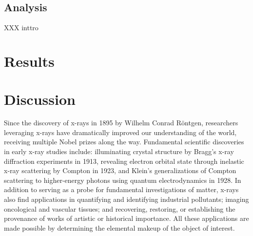 \documentclass[%
  aip,12pt,tightenlines,
  amsthm,
 amsmath,amssymb
]{article}
\newcommand{\fLabel}[1]{\label{figure:#1}}
\newcommand{\sLabel}[1]{\label{section:#1}}
\newcommand{\pcaption}[1]{\caption{\noindent#1}}
\newcommand{\firstp}[0]{}
\newcommand{\pl}[0]{\vspace{6pt}}
\newcommand{\pEndF}[0]{ \\ }
\newcommand{\pStartF}[0]{ }
\begin{document}
\subsection{Analysis}

XXX inttro

\section{\sLabel{Results}Results}

\section{\sLabel{Discussion}Discussion}


\firstp Since the discovery of x-rays in 1895 by Wilhelm Conrad R{\"o}ntgen, researchers leveraging x-rays have dramatically improved our understanding of the world, receiving multiple Nobel prizes along the way.\cite{santra_concepts_2009} Fundamental scientific discoveries in early x-ray studies include: illuminating crystal structure by Bragg's x-ray diffraction experiments in 1913,\cite{bragg_reflection_1913} revealing electron orbital state through inelastic x-ray scattering by Compton in 1923,\cite{compton_spectrum_1923} and Klein's generalizations of Compton scattering to higher-energy photons using quantum electrodynamics in 1928.\cite{klein_scattering_1928} In addition to serving as a probe for fundamental investigations of matter, x-rays also find applications in quantifying and identifying industrial pollutants;\cite{luo_determination_2012} imaging oncological and vascular tissues;\cite{butler_bio-medical_2008} and recovering, restoring, or establishing the provenance of works of artistic \cite{janssens_photon-based_2010} or historical \cite{bergmann_archimedes_2007} importance. All these applications are made possible by determining the elemental makeup of the object of interest. \pl

\end{document}
